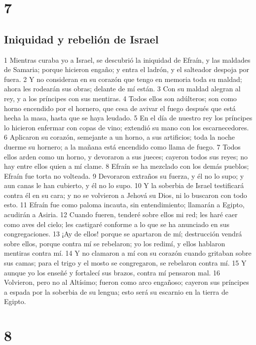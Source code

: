\chapter{7}

\section*{Iniquidad y rebelión de Israel}

1 Mientras curaba yo a Israel, se descubrió la iniquidad de Efraín, y las maldades de Samaria; porque hicieron engaño; y entra el ladrón, y el salteador despoja por fuera.
2 Y no consideran en su corazón que tengo en memoria toda su maldad; ahora les rodearán sus obras; delante de mí están.
3 Con su maldad alegran al rey, y a los príncipes con sus mentiras.
4 Todos ellos son adúlteros; son como horno encendido por el hornero, que cesa de avivar el fuego después que está hecha la masa, hasta que se haya leudado.
5 En el día de nuestro rey los príncipes lo hicieron enfermar con copas de vino; extendió su mano con los escarnecedores.
6 Aplicaron su corazón, semejante a un horno, a sus artificios; toda la noche duerme su hornero; a la mañana está encendido como llama de fuego.
7 Todos ellos arden como un horno, y devoraron a sus jueces; cayeron todos sus reyes; no hay entre ellos quien a mí clame.
8 Efraín se ha mezclado con los demás pueblos; Efraín fue torta no volteada.
9 Devoraron extraños su fuerza, y él no lo supo; y aun canas le han cubierto, y él no lo supo.
10 Y la soberbia de Israel testificará contra él en su cara; y no se volvieron a Jehová su Dios, ni lo buscaron con todo esto.
11 Efraín fue como paloma incauta, sin entendimiento; llamarán a Egipto, acudirán a Asiria.
12 Cuando fueren, tenderé sobre ellos mi red; les haré caer como aves del cielo; les castigaré conforme a lo que se ha anunciado en sus congregaciones.
13 ¡Ay de ellos! porque se apartaron de mí; destrucción vendrá sobre ellos, porque contra mí se rebelaron; yo los redimí, y ellos hablaron mentiras contra mí.
14 Y no clamaron a mí con su corazón cuando gritaban sobre sus camas; para el trigo y el mosto se congregaron, se rebelaron contra mí.
15 Y aunque yo los enseñé y fortalecí sus brazos, contra mí pensaron mal.
16 Volvieron, pero no al Altísimo; fueron como arco engañoso; cayeron sus príncipes a espada por la soberbia de su lengua; esto será su escarnio en la tierra de Egipto.

\chapter{8}

